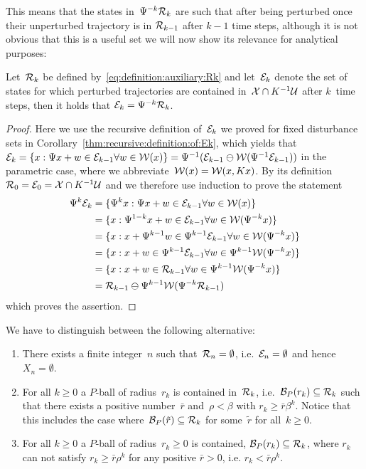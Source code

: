 %
This means that the states in~$\Psi^{-k} \mathcal R_k$ are such that after being perturbed once their unperturbed trajectory is in $\mathcal R_{k-1}$ after $k-1$ time steps, although it is not obvious that this is a useful set we will now show its relevance for analytical purposes:
%
\begin{thm}\label{thm:making:sense:of:Rk}
Let~$\mathcal R_k$ be defined by~\eqref{eq:definition:auxiliary:Rk} and let~$\mathcal E_k$ denote the set of states for which perturbed trajectories are contained in~$\mathcal X\cap K^{-1}\mathcal U$ after $k$~time steps, then it holds that $\mathcal E_k = \Psi^{-k}\mathcal R_k$.
\end{thm}
%
\begin{proof}
Here we use the recursive definition of~$\mathcal E_k$ we proved for fixed disturbance sets in Corollary~\ref{thm:recursive:definition:of:Ek}, which yields that $\mathcal E_k = \{x:\Psi x + w\in\mathcal E_{k-1}\forall w\in\mathcal W(x)\} = \Psi^{-1}(\mathcal E_{k-1}\ominus\mathcal W(\Psi^{-1}\mathcal E_{k-1}))$ in the parametric case, where we abbreviate~$\mathcal W(x) = \mathcal W(x,Kx)$.
%
By its definition~$\mathcal R_0 = \mathcal E_0 = \mathcal X\cap K^{-1}\mathcal U$ and we therefore use induction to prove the statement%
%
\begin{equation}\begin{aligned}
	\Psi^k\mathcal E_k 
	&= \{\Psi^k x:\Psi x+w\in\mathcal E_{k-1}\forall w\in\mathcal W(x)\}\\
	&= \{x:\Psi^{1-k}x+w\in\mathcal E_{k-1}\forall w\in\mathcal W(\Psi^{-k}x)\}\\
	&= \{x:x+ \Psi^{k-1}w\in\Psi^{k-1}\mathcal E_{k-1}\forall w\in\mathcal W(\Psi^{-k}x)\}\\
	&= \{x:x+w\in\Psi^{k-1}\mathcal E_{k-1}\forall w\in\Psi^{k-1}\mathcal W(\Psi^{-k}x)\}\\
	&= \{x:x+w\in\mathcal R_{k-1} \forall w\in\Psi^{k-1}\mathcal W(\Psi^{-k}x)\}\\
	&= \mathcal R_{k-1}\ominus\Psi^{k-1}\mathcal W(\Psi^{-k}\mathcal R_{k-1})
\end{aligned}\end{equation}
%
which proves the assertion.
\end{proof}
%
\noindent We have to distinguish between the following alternative:
%
\begin{enumerate}
\item There exists a finite integer~$n$ such that~$\mathcal R_n=\emptyset$, i.e.~$\mathcal E_n=\emptyset$ and hence~$X_n=\emptyset$.
%	
\item For all $k\geq 0$ a $P$-ball of radius~$r_k$ is contained in~$\mathcal R_k$, i.e.~$\mathcal B_P(r_k)\subseteq \mathcal R_k$ such that there exists a positive number~$\bar r$ and~$\rho<\beta$ with $r_k\geq \bar r \beta^k$. \label{item:a:ball:always:contained}
%
Notice that this includes the case where~$\mathcal B_P(\tilde r)\subseteq\mathcal R_k$ for some~$\tilde r$ for all~$k\geq0$.
%
\item For all $k\geq0$ a $P$-ball of radius~$r_k\geq0$ is contained, $\mathcal B_P(r_k)\subseteq \mathcal R_k$, where $r_k$ can not satisfy $r_k\geq \bar r\rho^k$ for any positive $\bar r>0$, i.e. $r_k< \bar r \rho^k$.
%
\end{enumerate}
